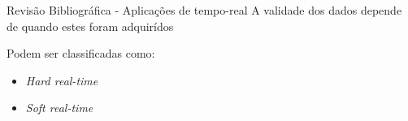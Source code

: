 \begin{frame}{Revis\~{a}o Bibliogr\'{a}fica - Aplicações de tempo-real}
	A validade dos dados depende de quando estes foram adquir\'{i}dos
	
	\medskip
	Podem ser classificadas como:
	\begin{itemize}
		\item \emph{Hard real-time}
		\item \emph{Soft real-time}
	\end{itemize}
\end{frame}